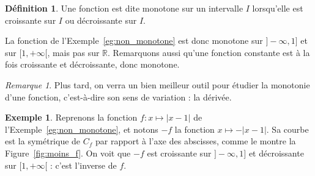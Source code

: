 \documentclass[12pt,a4paper]{article}
\theoremstyle{plain}
\theoremstyle{definition}
\newtheorem{definition}[theorem]{Définition}
\newtheorem{example}[theorem]{Exemple}
\theoremstyle{remark}
\newtheorem*{remark}{Remarque}
\begin{document}
\begin{tcolorbox}[navybar]
  \begin{definition}
    Une fonction est dite monotone sur un intervalle $I$ lorsqu'elle est croissante
    sur $I$ ou décroissante sur $I$.
  \end{definition}
\end{tcolorbox}

La fonction de l'Exemple~\ref{eg:non_monotone} est donc monotone sur $]-\infty, 1]$ et
sur $[1, +\infty[$, mais pas sur $\mathbb{R}$. Remarquons aussi qu'une fonction
constante est à la fois croissante et décroissante, donc monotone.

\begin{remark}
  Plus tard, on verra un bien meilleur outil pour étudier la monotonie d'une
  fonction, c'est-à-dire son sens de variation : la dérivée.
\end{remark}

\noindent
\begin{minipage}[c]{0.5\linewidth}
  \begin{example}
    Reprenons la fonction $f : x \mapsto \lvert x - 1 \rvert$ de
    l'Exemple~\ref{eg:non_monotone}, et notons $-f$ la fonction
    $x \mapsto -\lvert x - 1 \rvert$. Sa courbe est la symétrique de $C_f$ par rapport
    à l'axe des abscisses, comme le montre la Figure~\ref{fig:moins_f}. On voit que
    $-f$ est croissante sur $]-\infty, 1]$ et décroissante sur $[1, +\infty[$ :
    c'est l'inverse de $f$.
  \end{example}
\end{minipage}\hfill
\begin{minipage}[c]{0.42\linewidth}
  \captionsetup{hypcap=false, skip=12pt}
  
  \begin{minipage}[c][6cm][c]{\linewidth}
    \centering
  \end{minipage}
  
  \label{fig:moins_f}
\end{minipage}
\par
\vspace{0.5em}
\end{document}
